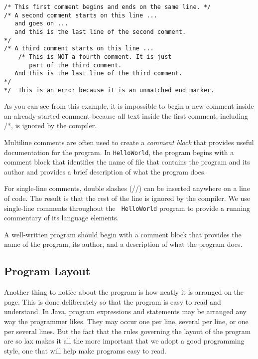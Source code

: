 \begin{jjjlisting}
\begin{lstlisting}
/* This first comment begins and ends on the same line. */
/* A second comment starts on this line ...
   and goes on ...
   and this is the last line of the second comment. 
*/ 
/* A third comment starts on this line ...
    /* This is NOT a fourth comment. It is just 
       part of the third comment.
   And this is the last line of the third comment. 
*/
*/  This is an error because it is an unmatched end marker.
\end{lstlisting}
\end{jjjlisting}

\noindent As you can see from this example, it is impossible
to begin a new comment inside an already-started comment because
all text inside the first comment, including /*, is ignored
by the compiler.


Multiline comments are often used to create a {\em comment block} that
provides useful documentation for the program. In {\tt HelloWorld},
the program begins with a comment block that identifies the name of
file that contains the program and its author and provides a brief
description of what the program does.

For single-line comments, double slashes (//) can be inserted anywhere
on a line of code. The result is that the rest of the line is ignored
by the compiler.  We use single-line comments throughout the {\tt
HelloWorld} program to provide a running commentary of its language
elements.

%
{A well-written program should begin with a comment block that provides
the name of the program, its author, and a description of what the
program does.}

\subsection{Program Layout}

Another thing to notice about the program is how neatly it is arranged
on the page. This is done deliberately so that the program is easy to
read and understand. In Java, program expressions and statements may
be arranged any way the programmer likes. They may occur one per line,
several per line, or one per several lines.  But the fact that the
rules governing the layout of the program are so lax makes it all the
more important that we adopt a good programming style, one that will
help make programs easy to read.

